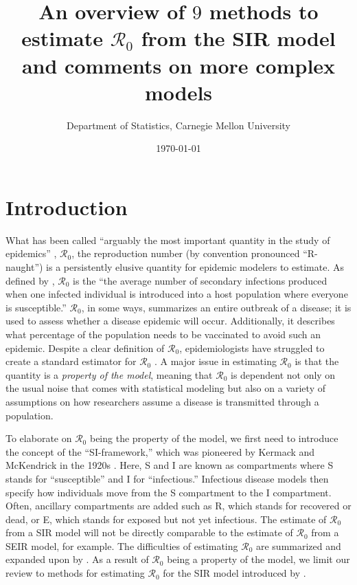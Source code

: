 \documentclass[12pt]{article}
\newcommand{\xxsir}{\ensuremath{9}} %
\newcommand{\rr}{\ensuremath{\mathcal{R}_0}}
\begin{document}




\title{An overview of $\xxsir$ methods to estimate $\rr$ from the SIR model and comments on more complex models}
\author{ Department of Statistics, Carnegie Mellon University}
\date{\today}
\maketitle



\section{Introduction}\label{sec:intro}
What has been called ``arguably the most important quantity in the study of epidemics'' \citep{Heesterbeek2002},  $\mathcal{R}_0$, the reproduction number (by convention pronounced ``R-naught'') is a persistently elusive quantity for epidemic modelers to estimate.  As defined by \citet{anderson1992}, $\rr$ is the ``the average number of secondary infections produced when one infected individual is introduced into a host population where everyone is susceptible.''  $\rr$, in some ways, summarizes an entire outbreak of a disease; it  is used to assess whether a disease epidemic will occur.  Additionally, it describes what percentage of the population needs to be vaccinated to avoid such an epidemic.  Despite a clear definition of $\rr$, epidemiologists have struggled to create a standard  estimator for $\rr$  \citep{hethcote2000}.  A major issue in estimating $\rr$ is that the quantity is a \textit{property of the model}, meaning that $\rr$ is dependent not only on the usual noise that comes with statistical modeling but also on a variety of assumptions on how researchers assume a disease is transmitted through a population.

To elaborate on $\rr$ being the property of the model, we first need to introduce the concept of the ``SI-framework,'' which was pioneered by Kermack and McKendrick in the 1920s \citep{getz2006}.   Here, S and I are known as compartments where S stands for ``susceptible'' and I for ``infectious.'' Infectious disease models then specify how individuals move from the S compartment to the I compartment.  Often, ancillary compartments are added such as R, which stands for recovered or dead, or E, which stands for exposed but not yet infectious.  The estimate of $\rr$ from a SIR model will not be directly comparable to the estimate of $\rr$ from a SEIR model, for example.  The difficulties of estimating $\rr$ are summarized and expanded upon by \cite{li2011}.   As a result of $\rr$ being a property of the model, we limit our review to methods for estimating $\rr$ for the SIR model introduced by \cite{Kermack700}.
\end{document}
